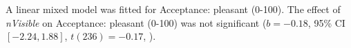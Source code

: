 A linear mixed model was fitted for Acceptance: pleasant (0-100).
The effect of \textit{nVisible} on Acceptance: pleasant (0-100) was not significant ($b = -0.18$, 95\% CI $[-2.24, 1.88]$, $t(236) = -0.17$, ).
